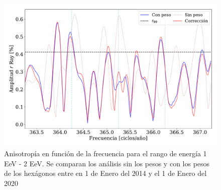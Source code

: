 \begin{figure}[H]
	\centering
	\includegraphics[width=0.85\linewidth]{pesos_sin_con_1_2_EeV.pdf}
	\caption{Anisotropía en función de la frecuencia para el rango de energía 1  EeV - 2 EeV. Se comparan los análisis sin los pesos y con los pesos de los hexágonos entre en 1 de Enero del 2014 y el 1 de Enero del 2020}
	\label{anisotropia_rayleigh}
\end{figure}



